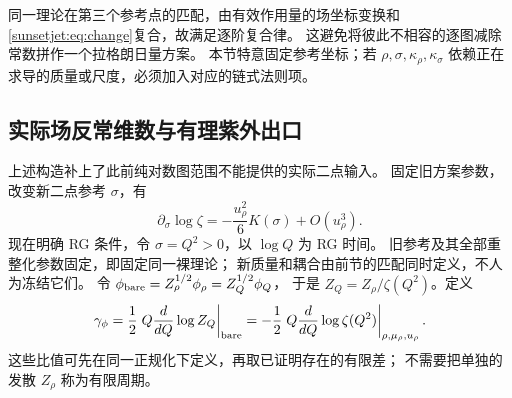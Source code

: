 \documentclass[11pt,a4paper,oneside]{ctexart}
\theoremstyle{cnplain}
\theoremstyle{definition}
\theoremstyle{remark}
\numberwithin{equation}{section}
\begin{document}
同一理论在第三个参考点的匹配，由有效作用量的场坐标变换和
\eqref{sunsetjet:eq:change}复合，故满足逐阶复合律。
这避免将彼此不相容的逐图减除常数拼作一个拉格朗日量方案。
本节特意固定参考坐标；若 $\rho,\sigma,\kappa_\rho,\kappa_\sigma$
依赖正在求导的质量或尺度，必须加入对应的链式法则项。


\subsection{实际场反常维数与有理紫外出口}
上述构造补上了此前纯对数图范围不能提供的实际二点输入。
固定旧方案参数，改变新二点参考 $\sigma$，有
\begin{equation}\label{sunsetjet:eq:scale-response}
 \partial_\sigma\log\zeta=-\frac{u_\rho^2}{6}K(\sigma)+O(u_\rho^3).
\end{equation}
现在明确 RG 条件，令 $\sigma=Q^2>0$，以 $\log Q$ 为 RG 时间。
旧参考及其全部重整化参数固定，即固定同一裸理论；
新质量和耦合由前节的匹配同时定义，不人为冻结它们。
令 $\phi_{\rm bare}=Z_\rho^{1/2}\phi_\rho=Z_Q^{1/2}\phi_Q$，
于是 $Z_Q=Z_\rho/\zeta(Q^2)$。定义
\begin{equation}\label{sunsetjet:eq:gamma-def}
 \gamma_\phi=\frac12\left.Q\frac{d}{dQ}\log Z_Q\right|_{\rm bare}
 =-\frac12\left.Q\frac{d}{dQ}\log\zeta(Q^2)\right|_{\rho,\mu_\rho,u_\rho}.
\end{equation}
这些比值可先在同一正规化下定义，再取已证明存在的有限差；
不需要把单独的发散 $Z_\rho$ 称为有限周期。
\end{document}

